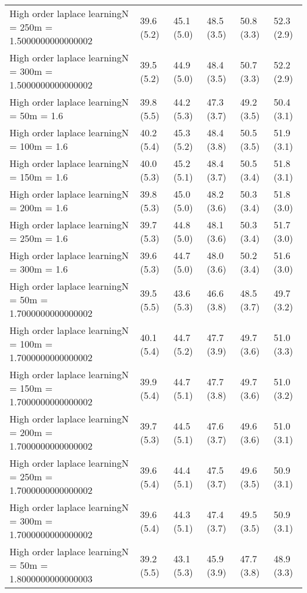 \documentclass{article}
\begin{document}
\begin{table*}[t!]
\begin{center}
\begin{small}
\begin{sc}
\begin{tabular}{llllll}
High order laplace learningN = 250m = 1.5000000000000002&39.6 (5.2)      &45.1 (5.0)      &48.5 (3.5)      &50.8 (3.3)      &52.3 (2.9)      \\
High order laplace learningN = 300m = 1.5000000000000002&39.5 (5.2)      &44.9 (5.0)      &48.4 (3.5)      &50.7 (3.3)      &52.2 (2.9)      \\
High order laplace learningN = 50m = 1.6&39.8 (5.5)      &44.2 (5.3)      &47.3 (3.7)      &49.2 (3.5)      &50.4 (3.1)      \\
High order laplace learningN = 100m = 1.6&40.2 (5.4)      &45.3 (5.2)      &48.4 (3.8)      &50.5 (3.5)      &51.9 (3.1)      \\
High order laplace learningN = 150m = 1.6&40.0 (5.3)      &45.2 (5.1)      &48.4 (3.7)      &50.5 (3.4)      &51.8 (3.1)      \\
High order laplace learningN = 200m = 1.6&39.8 (5.3)      &45.0 (5.0)      &48.2 (3.6)      &50.3 (3.4)      &51.8 (3.0)      \\
High order laplace learningN = 250m = 1.6&39.7 (5.3)      &44.8 (5.0)      &48.1 (3.6)      &50.3 (3.4)      &51.7 (3.0)      \\
High order laplace learningN = 300m = 1.6&39.6 (5.3)      &44.7 (5.0)      &48.0 (3.6)      &50.2 (3.4)      &51.6 (3.0)      \\
High order laplace learningN = 50m = 1.7000000000000002&39.5 (5.5)      &43.6 (5.3)      &46.6 (3.8)      &48.5 (3.7)      &49.7 (3.2)      \\
High order laplace learningN = 100m = 1.7000000000000002&40.1 (5.4)      &44.7 (5.2)      &47.7 (3.9)      &49.7 (3.6)      &51.0 (3.3)      \\
High order laplace learningN = 150m = 1.7000000000000002&39.9 (5.4)      &44.7 (5.1)      &47.7 (3.8)      &49.7 (3.6)      &51.0 (3.2)      \\
High order laplace learningN = 200m = 1.7000000000000002&39.7 (5.3)      &44.5 (5.1)      &47.6 (3.7)      &49.6 (3.6)      &51.0 (3.1)      \\
High order laplace learningN = 250m = 1.7000000000000002&39.6 (5.4)      &44.4 (5.1)      &47.5 (3.7)      &49.6 (3.5)      &50.9 (3.1)      \\
High order laplace learningN = 300m = 1.7000000000000002&39.6 (5.4)      &44.3 (5.1)      &47.4 (3.7)      &49.5 (3.5)      &50.9 (3.1)      \\
High order laplace learningN = 50m = 1.8000000000000003&39.2 (5.5)      &43.1 (5.3)      &45.9 (3.9)      &47.7 (3.8)      &48.9 (3.3)      \\

\end{tabular}
\end{sc}
\end{small}
\end{center}
\end{table*}
\end{document}
